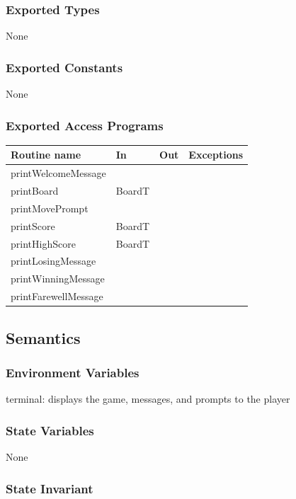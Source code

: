 \documentclass[12pt]{article}
\begin{document}
\subsubsection* {Exported Types}

None

\subsubsection* {Exported Constants}

None

\subsubsection* {Exported Access Programs}

\begin{tabular}{| l | l | l | p{6cm} |}
\hline
\textbf{Routine name} & \textbf{In} & \textbf{Out} & \textbf{Exceptions}\\
\hline
printWelcomeMessage & ~ & ~ &  \\
\hline
printBoard & BoardT & ~ & \\
\hline
printMovePrompt & ~ & ~ & \\
\hline
printScore & BoardT & ~ & \\
\hline
printHighScore & BoardT & ~ & \\
\hline
printLosingMessage & ~ & ~ & \\
\hline
printWinningMessage & ~ & ~ & \\
\hline
printFarewellMessage & ~ & ~ & \\
\hline
\end{tabular}

\subsection* {Semantics}

\subsubsection* {Environment Variables}

terminal: displays the game, messages, and prompts to the player

\subsubsection* {State Variables}

None

\subsubsection* {State Invariant}
\end{document}
